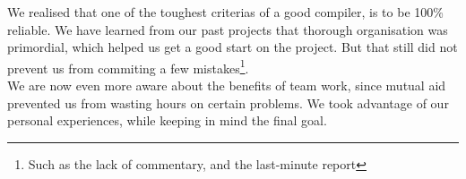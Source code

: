 \documentclass{article}
\begin{document}
We realised that one of the toughest criterias of a good compiler, is to be 100\% reliable.
We have learned from our past projects that thorough organisation was primordial, which helped us get a good start on the project. But that still did not prevent us from commiting a few mistakes\footnote{Such as the lack of commentary, and the last-minute report}.\\

We are now even more aware about the benefits of team work, since mutual aid prevented us from wasting hours on certain problems. We took advantage of our personal experiences, while keeping in mind the final goal.
\end{document}
